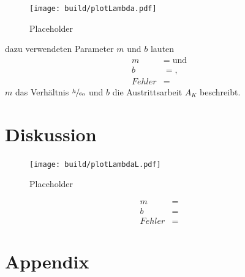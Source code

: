     \begin{figure}[H]
        \centering
        \texttt{[image: build/plotLambda.pdf]}
        \caption{Placeholder}
        \label{fig:10}
    \end{figure}

    \justifying dazu verwendeten Parameter $m$ und $b$ lauten
    \begin{align}
    m &= \text{}\;\text{und}\\
    b &= \text{},\\
    Fehler &= \text{}   
    \end{align}
    \justifying $m$ das Verhältnis $\sfrac{h}{e_0}$ und $b$ die Austrittsarbeit $A_K$ beschreibt.

\section{Diskussion}

    \begin{figure}[H]
        \centering
        \texttt{[image: build/plotLambdaL.pdf]}
        \caption{Placeholder}
        \label{fig:10}
    \end{figure}

    \begin{align}
    m &= \text{}\\
    b &= \text{}\\
    Fehler &= \text{}   
    \end{align}

\newpage
\printbibliography

\newpage
\section{Appendix}

\begin{table}[H]
    \centering
    \caption{}
    
    \label{tab:1}
\end{table}

\begin{table}[H]
    \centering
    \caption{}
    
    \label{tab:2}
\end{table}

\begin{table}[H]
    \centering
    \caption{}
    
    \label{tab:3}
\end{table}




